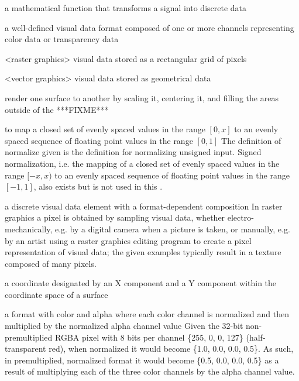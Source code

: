 a mathematical function that transforms a signal into discrete data

a well-defined visual data format composed of one or more channels representing 
color data or transparency data

<raster graphics> visual data stored as a rectangular grid of pixels

<vector graphics> visual data stored as geometrical data

render one surface to another by scaling it, centering it, and filling the 
areas outside of the  ***FIXME***

to map a closed set of evenly spaced values in the range $[0, x]$ to an evenly spaced sequence of floating point values in the range $[0, 1]$
\enternote
The definition of normalize given is the definition for normalizing unsigned input. Signed normalization, i.e. the mapping of a closed set of evenly spaced values in the range $[-x, x)$ to an evenly spaced sequence of floating point values in the range $[-1, 1]$, also exists but is not used in this \documenttypename.
\exitnote

a discrete visual data element with a format-dependent composition
\enternote
In raster graphics a pixel is obtained by sampling visual data, whether 
electro-mechanically, e.g. by a digital camera when a picture is taken, or 
manually, e.g. by an artist using a raster graphics editing program to create a 
pixel representation of visual data; the given examples typically result in a 
texture composed of many pixels.
\exitnote

a coordinate designated by an X component and a Y component within the 
coordinate space of a surface

a format with color and alpha where each color channel is normalized and then 
multiplied by the normalized alpha channel value
\enterexample
Given the 32-bit non-premultiplied RGBA pixel with 8 bits per channel \{255, 0, 
0, 127\} (half-transparent red), when normalized it would become \{1.0, 0.0, 
0.0, 0.5\}. As such, in premultiplied, normalized format it would become \{0.5, 
0.0, 0.0, 0.5\} as a result of multiplying each of the three color channels by 
the alpha channel value.
\exitexample

